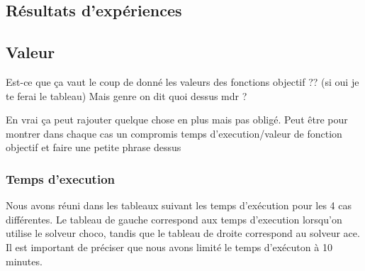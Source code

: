 \documentclass[a4paper, 10pt]{article}
\begin{document}
    \subsection{Résultats d'expériences}

      \subsection{Valeur}

      Est-ce que ça vaut le coup de donné les valeurs des fonctions objectif ?? (si oui je te ferai le tableau) Mais genre on dit quoi dessus mdr ?

      En vrai ça peut rajouter quelque chose en plus mais pas obligé. Peut être pour montrer dans chaque cas un compromis temps d'execution/valeur de fonction objectif et faire une petite phrase dessus

      \subsubsection{Temps d'execution}

      Nous avons réuni dans les tableaux suivant les temps d'exécution pour les 4 cas différentes. Le tableau de gauche correspond aux temps d'execution lorsqu'on utilise le solveur choco, tandis que le tableau de droite correspond au solveur ace. Il est important de préciser que nous avons limité le temps d'exécuton à 10 minutes.
\end{document}

